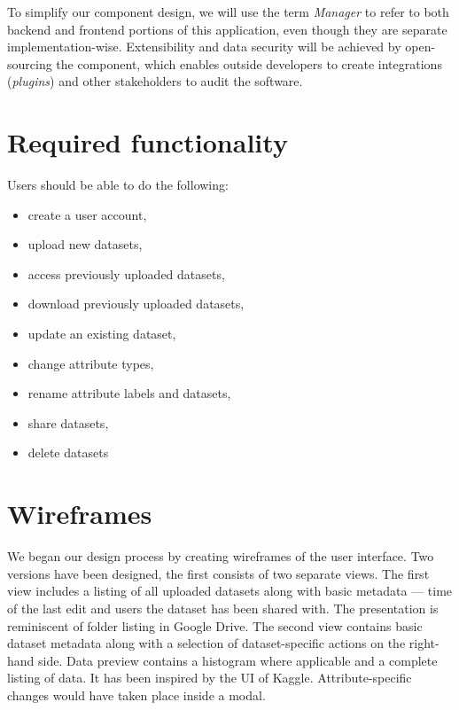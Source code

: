 \documentclass[thesis=M,english,hidelinks]{FITthesisXE}[2012/06/26]
\begin{document}
To simplify our component design, we will use the term \emph{Manager} to refer to both backend and frontend portions of this application, even though they are separate implementation-wise. Extensibility and data security will be achieved by open-sourcing the component, which enables outside developers to create integrations (\emph{plugins}) and other stakeholders to audit the software.

\section{Required functionality}

Users should be able to do the following:

\begin{itemize}
\item create a user account,
\item upload new datasets,
\item access previously uploaded datasets,
\item download previously uploaded datasets,
\item update an existing dataset,
\item change attribute types,
\item rename attribute labels and datasets,
\item share datasets,
\item delete datasets
\end{itemize}

\section{Wireframes}

We began our design process by creating wireframes of the user interface. Two versions have been designed, the first consists of two separate views. The first view includes a listing of all uploaded datasets along with basic metadata --- time of the last edit and users the dataset has been shared with. The presentation is reminiscent of folder listing in Google Drive.\autocite{gdrive} The second view contains basic dataset metadata along with a selection of dataset-specific actions on the right-hand side. Data preview contains a histogram where applicable and a complete listing of data. It has been inspired by the UI of Kaggle.\autocite{kaggle} Attribute-specific changes would have taken place inside a modal.
\end{document}
